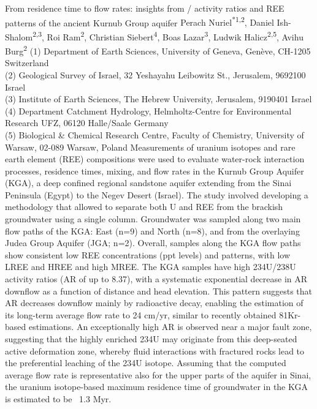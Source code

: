 \begin{conf-abstract}
{From residence time to flow rates: insights from / activity ratios and REE patterns of the ancient Kurnub Group aquifer}
{Perach Nuriel\textsuperscript{*1,2}, Daniel Ish-Shalom\textsuperscript{2,3}, Roi Ram\textsuperscript{2}, Christian Siebert\textsuperscript{4}, Boas Lazar\textsuperscript{3}, Ludwik Halicz\textsuperscript{2,5}, Avihu Burg\textsuperscript{2}}
{(1) Department of Earth Sciences, University of Geneva, Genève, CH-1205 Switzerland \\
(2) Geological Survey of Israel, 32 Yeshayahu Leibowitz St., Jerusalem, 9692100 Israel\\
(3) Institute of Earth Sciences, The Hebrew University, Jerusalem, 9190401 Israel\\
(4) Department Catchment Hydrology, Helmholtz-Centre for Environmental Research UFZ, 06120 Halle/Saale Germany\\
(5) Biological \& Chemical Research Centre, Faculty of Chemistry, University of Warsaw, 02-089 Warsaw, Poland}
{Measurements of uranium isotopes and rare earth element (REE) compositions were used to evaluate water-rock interaction processes, residence times, mixing, and flow rates in the Kurnub Group Aquifer (KGA), a deep confined regional sandstone aquifer extending from the Sinai Peninsula (Egypt) to the Negev Desert (Israel). The study involved developing a methodology that allowed to separate both U and REE from the brackish groundwater using a single column. Groundwater was sampled along two main flow paths of the KGA: East (n=9) and North (n=8), and from the overlaying Judea Group Aquifer (JGA; n=2). Overall, samples along the KGA flow paths show consistent low REE concentrations (ppt levels) and patterns, with low LREE and HREE and high MREE. The KGA samples have high 234U/238U activity ratios (AR of up to 8.37), with a systematic exponential decrease in AR downflow as a function of distance and head elevation. This pattern suggests that AR decreases downflow mainly by radioactive decay, enabling the estimation of its long-term average flow rate to 24 cm/yr, similar to recently obtained 81Kr-based estimations. An exceptionally high AR is observed near a major fault zone, suggesting that the highly enriched 234U may originate from this deep-seated active deformation zone, whereby fluid interactions with fractured rocks lead to the preferential leaching of the 234U isotope. Assuming that the computed average flow rate is representative also for the upper parts of the aquifer in Sinai, the uranium isotope-based maximum residence time of groundwater in the KGA is estimated to be ~1.3 Myr.}
\end{conf-abstract}
